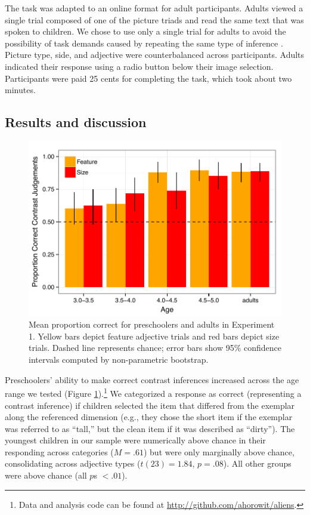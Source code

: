 \documentclass[man]{apa2}
\begin{document}
The task was adapted to an online format for adult participants.  Adults viewed a single trial composed of one of the picture triads and read the same text that was spoken to children. We chose to use only a single trial for adults to avoid the possibility of task demands caused by repeating the same type of inference \cite{frank2012}. Picture type, side, and adjective were counterbalanced across participants.  Adults indicated their response using a radio button below their image selection.  Participants were paid 25 cents for completing the task, which took about two minutes. 

\subsection{Results and discussion}

\begin{figure}[t] 
  \begin{center} 
    \includegraphics[width=5in]{figures/expt1_mod.pdf} 
    \caption{\label{fig:expt1_kidsAdults} Mean proportion correct for preschoolers and adults in Experiment 1. Yellow bars depict feature adjective trials and red bars depict size trials. Dashed line represents chance; error bars show 95\% confidence intervals computed by non-parametric bootstrap.}
  \end{center} 
\end{figure}	

Preschoolers' ability to make correct contrast inferences increased across the age range we tested (Figure \ref{fig:expt1_kidsAdults}).\footnote{Data and analysis code can be found at \url{http://github.com/ahorowit/aliens}.} We categorized a response as correct (representing a contrast inference) if children selected the item that differed from the exemplar along the referenced dimension (e.g., they chose the short item if the exemplar was referred to as ``tall,'' but the clean item if it was described as ``dirty''). The youngest children in our sample were numerically above chance in their responding across categories ($M=.61$) but were only marginally above chance, consolidating across adjective types ($t(23) = 1.84$, $p = .08$). All other groups were above chance (all $p$s $< .01$). 
\end{document}
